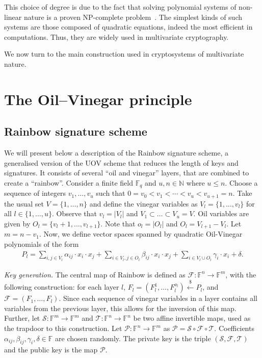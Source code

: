 \documentclass[openright]{report}
\newcommand{\random}{\stackrel{\$}{\longleftarrow}}
\begin{document}
This choice of degree is due to the fact that solving polynomial systems of non-linear nature is a proven NP-complete problem~\cite{}. The simplest kinds of such systems are those composed of quadratic equations, indeed the most efficient in computations. Thus, they are widely used in multivariate cryptography.

We now turn to the main construction used in cryptosystems of multivariate nature. %

\section{The Oil--Vinegar principle}\label{sec:oil}

\subsection{Rainbow signature scheme}\label{subsec:scheme}

We will present below a description of the Rainbow signature scheme, a
generalised version of the UOV scheme that reduces the length of keys and
signatures. It consists of several ``oil and vinegar'' layers, that are
combined to create a ``rainbow''. Consider a finite field $\mathbb{F}_{q}$ and
$u, n \in \mathbb{N}$ where $u \leq n$. Choose a sequence of integers
$v_{1}, \dots, v_{u}$ such that
$0 = v_{0} < v_{1} < \cdots < v_{u} < v_{u + 1} = n$. Take the usual set
$V = \{1, \dots, n\}$ and define the vinegar variables as
$V_{l} = \{1, \dots, v_{l}\}$ for all $l \in \{1, \dots, u\}$. Observe that
$v_{l} = |V_{l}|$ and $V_{1} \subset \dots \subset V_{u} = V$. Oil variables
are given by $O_{l} = \{v_{l} + 1, \dots, v_{l + 1}\}$. Note that
$o_{l} = |O_{l}|$ and $O_{l} = V_{l + 1} - V_{l}$. Let $m = n - v_{1}$. Now,
we define vector spaces spanned by quadratic Oil-Vinegar polynomials of the
form
\begin{align}
  P_{l} = \sum_{i, j \in V_{l}} \alpha_{ij} \cdot x_{i} \cdot x_{j}
    + \sum_{i \in V_{l}, j \in O_{l}} \beta_{ij} \cdot x_{i} \cdot x_{j}
    + \sum_{i \in V_{l} \cup O_{l}} \gamma_{i} \cdot x_{i} + \delta.
\end{align}

\emph{Key generation.} The central map of Rainbow is defined as
$\mathcal{F} : \mathbb{F}^{n} \longrightarrow \mathbb{F}^{m}$, with the
following construction: for each layer $l$,
$F_{l} = (F_{l}^{1}, \dots, F_{l}^{o_{l}}) \random{} P_{l}$,
and $\mathcal{F} = (F_{1}, \dots, F_{l})$. Since each sequence of vinegar
variables in a layer contains all variables from the previous layer, this
allows for the inversion of this map. Further, let
$\mathcal{S} : \mathbb{F}^{m} \longrightarrow \mathbb{F}^{m}$ and
$\mathcal{T} : \mathbb{F}^{n} \longrightarrow \mathbb{F}^{n}$ be two affine
invertible maps, used as the trapdoor to this construction. Let
$\mathcal{P} : \mathbb{F}^{n} \longrightarrow \mathbb{F}^{m}$ as
$\mathcal{P} = \mathcal{S} \circ \mathcal{F} \circ \mathcal{T}$.
Coefficients $\alpha_{ij}, \beta_{ij}, \gamma_{i}, \delta \in \mathbb{F}$ are
chosen randomly. The private key is the triple
$(\mathcal{S}, \mathcal{F}, \mathcal{T})$ and the public key is the map
$\mathcal{P}$.
\end{document}
